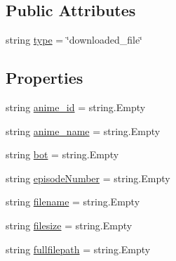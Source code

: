 \subsection*{Public Attributes}
\begin{DoxyCompactItemize}
\item 
string \mbox{\hyperlink{class_little_weeb_library_1_1_models_1_1_json_downloaded_info_af85c70bf9535518e09e0888c4627cd36}{type}} = \char`\"{}downloaded\+\_\+file\char`\"{}
\end{DoxyCompactItemize}
\subsection*{Properties}
\begin{DoxyCompactItemize}
\item 
string \mbox{\hyperlink{class_little_weeb_library_1_1_models_1_1_json_downloaded_info_a400a0cb7bf87a5c5a03c099ebd95fc07}{anime\+\_\+id}} = string.\+Empty
\item 
string \mbox{\hyperlink{class_little_weeb_library_1_1_models_1_1_json_downloaded_info_a48cda1035291586df653b956a5075a24}{anime\+\_\+name}} = string.\+Empty
\item 
string \mbox{\hyperlink{class_little_weeb_library_1_1_models_1_1_json_downloaded_info_a29e4d7e91a121867373b693e2008c6ba}{bot}} = string.\+Empty
\item 
string \mbox{\hyperlink{class_little_weeb_library_1_1_models_1_1_json_downloaded_info_ad4c26e6a2088b99100d58cf0bc417078}{episode\+Number}} = string.\+Empty
\item 
string \mbox{\hyperlink{class_little_weeb_library_1_1_models_1_1_json_downloaded_info_a7a6955e2db300470aeaefba5d92b1a4b}{filename}} = string.\+Empty
\item 
string \mbox{\hyperlink{class_little_weeb_library_1_1_models_1_1_json_downloaded_info_adf6c38e7fc82ee9f1e08e47ed4e4ba30}{filesize}} = string.\+Empty
\item 
string \mbox{\hyperlink{class_little_weeb_library_1_1_models_1_1_json_downloaded_info_a6bd6f4b0515ff75d2dac485ff1a7f434}{fullfilepath}} = string.\+Empty

\end{DoxyCompactItemize}
